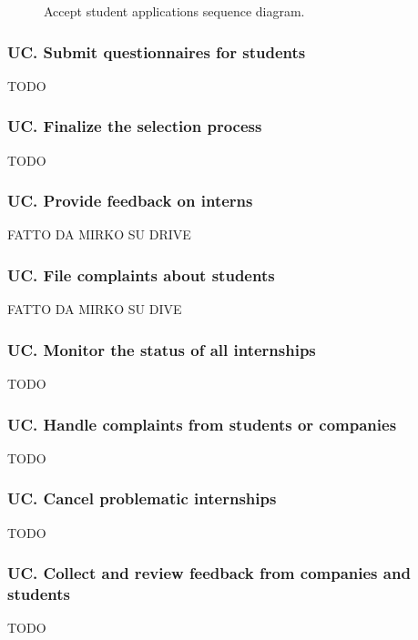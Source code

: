 \begin{figure}[H]
    \begin{center}
        
        \caption{Accept student applications sequence diagram.}
        \label{fig:accept_student_applications_seqd}%
    \end{center}
\end{figure}

\subsubsection*{UC\cuc . Submit questionnaires for students}
TODO

\subsubsection*{UC\cuc . Finalize the selection process}
TODO

\subsubsection*{UC\cuc . Provide feedback on interns}
FATTO DA MIRKO SU DRIVE

\subsubsection*{UC\cuc . File complaints about students}
FATTO DA MIRKO SU DIVE

\subsubsection*{UC\cuc . Monitor the status of all internships}
TODO

\subsubsection*{UC\cuc . Handle complaints from students or companies}
TODO

\subsubsection*{UC\cuc . Cancel problematic internships}
TODO

\subsubsection*{UC\cuc . Collect and review feedback from companies and students}
TODO


